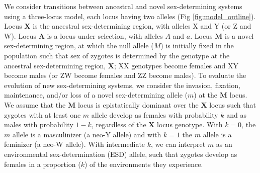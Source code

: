 \documentclass[10pt,letterpaper]{article}
\begin{document}
We consider transitions between ancestral and novel sex-determining systems using a three-locus model, each locus having two alleles (Fig \ref{fig:model_outline}). 
Locus $\mathbf{X}$ is the ancestral sex-determining region, with alleles X and Y (or Z and W).
Locus $\mathbf{A}$ is a locus under selection, with alleles $A$ and $a$.
Locus $\mathbf{M}$ is a novel sex-determining region, at which the null allele ($M$) is initially fixed in the population such that sex of zygotes is determined by the genotype at the ancestral sex-determining region, $\mathbf{X}$; XX genotypes become females and XY become males (or ZW become females and ZZ become males). 
To evaluate the evolution of new sex-determining systems, we consider the invasion, fixation, maintenance, and/or loss of a novel sex-determining allele ($m$) at the $\mathbf{M}$ locus. 
We assume that the $\mathbf{M}$ locus is epistatically dominant over the $\mathbf{X}$ locus such that zygotes with at least one $m$ allele develop as females with probability $k$ and as males with probability $1-k$, regardless of the $\mathbf{X}$ locus genotype.
With $k=0$, the $m$ allele is a masculinizer (a neo-Y allele) and with $k=1$ the $m$ allele is a feminizer (a neo-W allele).
With intermediate $k$, we can interpret $m$ as an environmental sex-determination (ESD) allele, such that zygotes develop as females in a proportion ($k$) of the environments they experience. 
\end{document}
